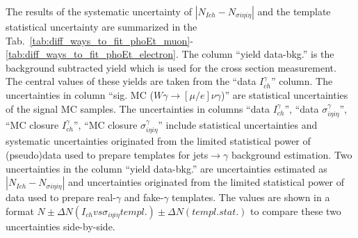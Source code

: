 The results of the systematic uncertainty of $|N_{Ich}-N_{\sigma i\eta i\eta}|$ and the template statistical uncertainty are summarized in the Tab.~\ref{tab:diff_ways_to_fit_phoEt_muon}-\ref{tab:diff_ways_to_fit_phoEt_electron}. The column ``yield data-bkg.'' is the background subtracted yield which is used for the cross section measurement. The central values of these yields are taken from the ``data $I_{ch}^{\gamma}$'' column. The uncertainties in column ``sig. MC ($W\gamma\rightarrow[\mu/e]\nu\gamma$)'' are statistical uncertainties of the signal MC samples. The uncertainties in columns ``data $I_{ch}^{\gamma}$'', ``data $\sigma_{i\eta i\eta}^\gamma$'', ``MC closure $I_{ch}^{\gamma}$'', ``MC closure $\sigma_{i\eta i\eta}^\gamma$'' include statistical uncertainties and systematic uncertainties originated from the limited statistical power of (pseudo)data used to prepare templates for jets$\rightarrow\gamma$ background estimation. Two uncertainties in the column ``yield data-bkg.'' are uncertainties estimated as $|N_{Ich}-N_{\sigma i\eta i\eta}|$ and uncertainties originated from the limited statistical power of data used to prepare real-$\gamma$ and fake-$\gamma$ templates. The values are shown in a format $N\pm\Delta N(I_{ch} vs \sigma_{i\eta i\eta} templ.)\pm \Delta N(templ. stat.)$ to compare these two uncertainties side-by-side.  %

